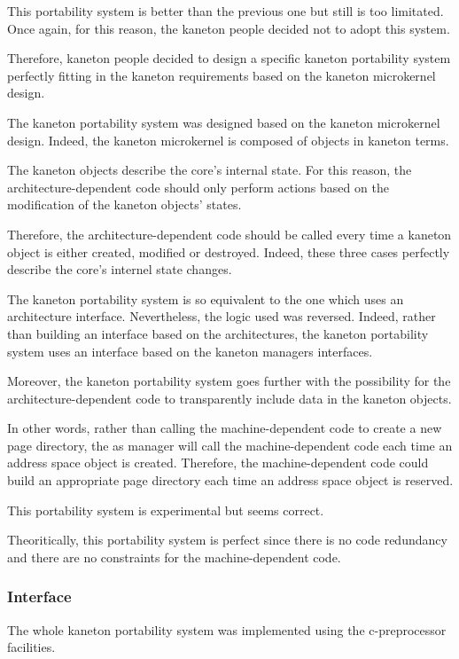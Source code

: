 This portability system is better than the previous one but still is too
limitated. Once again, for this reason, the kaneton people decided not
to adopt this system.

Therefore, kaneton people decided to design a specific kaneton portability
system perfectly fitting in the kaneton requirements based on the kaneton
microkernel design.

The kaneton portability system was designed based on the kaneton microkernel
design. Indeed, the kaneton microkernel is composed of objects in
kaneton terms.

The kaneton objects describe the core's internal state. For this reason,
the architecture-dependent code should only perform actions based on
the modification of the kaneton objects' states.

Therefore, the architecture-dependent code should be called every time
a kaneton object is either created, modified or destroyed. Indeed, these
three cases perfectly describe the core's internel state changes.

The kaneton portability system is so equivalent to the one which uses
an architecture interface. Nevertheless, the logic used was reversed.
Indeed, rather than building an interface based on the architectures, the
kaneton portability system uses an interface based on the kaneton managers
interfaces.

Moreover, the kaneton portability system goes further with the possibility
for the architecture-dependent code to transparently include data in the
kaneton objects.

In other words, rather than calling the machine-dependent code to create
a new page directory, the as manager will call the machine-dependent code
each time an address space object is created. Therefore, the
machine-dependent code could build an appropriate page directory each time
an address space object is reserved.

This portability system is experimental but seems correct.

Theoritically, this portability system is perfect since there is no
code redundancy and there are no constraints for the machine-dependent
code.

%
%

\subsubsection{Interface}

The whole kaneton portability system was implemented using the
c-preprocessor facilities.

